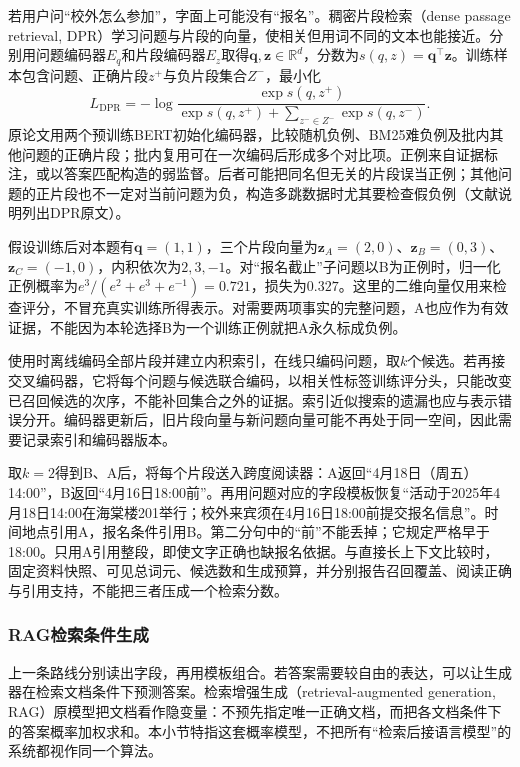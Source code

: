 若用户问“校外怎么参加”，字面上可能没有“报名”。稠密片段检索（dense passage retrieval, DPR）学习问题与片段的向量，使相关但用词不同的文本也能接近。分别用问题编码器$E_q$和片段编码器$E_z$取得$\bm{q},\bm{z}\in\mathbb{R}^d$，分数为$s(q,z)=\bm{q}^{\top}\bm{z}$。训练样本包含问题、正确片段$z^+$与负片段集合$Z^-$，最小化
\begin{equation}
 L_{\mathrm{DPR}}=
 -\log\frac{\exp s(q,z^+)}
 {\exp s(q,z^+)+\sum_{z^-\in Z^-}\exp s(q,z^-)}.
 \label{eq:nlp-dialogue-dpr}
\end{equation}
原论文用两个预训练BERT初始化编码器，比较随机负例、BM25难负例及批内其他问题的正确片段；批内复用可在一次编码后形成多个对比项。正例来自证据标注，或以答案匹配构造的弱监督。后者可能把同名但无关的片段误当正例；其他问题的正片段也不一定对当前问题为负，构造多跳数据时尤其要检查假负例（文献说明列出DPR原文）。

假设训练后对本题有$\bm{q}=(1,1)$，三个片段向量为$\bm{z}_A=(2,0)$、$\bm{z}_B=(0,3)$、$\bm{z}_C=(-1,0)$，内积依次为$2,3,-1$。对“报名截止”子问题以B为正例时，归一化正例概率为$e^3/(e^2+e^3+e^{-1})=0.721$，损失为$0.327$。这里的二维向量仅用来检查评分，不冒充真实训练所得表示。对需要两项事实的完整问题，A也应作为有效证据，不能因为本轮选择B为一个训练正例就把A永久标成负例。

使用时离线编码全部片段并建立内积索引，在线只编码问题，取$k$个候选。若再接交叉编码器，它将每个问题与候选联合编码，以相关性标签训练评分头，只能改变已召回候选的次序，不能补回集合之外的证据。索引近似搜索的遗漏也应与表示错误分开。编码器更新后，旧片段向量与新问题向量可能不再处于同一空间，因此需要记录索引和编码器版本。

取$k=2$得到B、A后，将每个片段送入跨度阅读器：A返回“4月18日（周五）14:00”，B返回“4月16日18:00前”。再用问题对应的字段模板恢复“活动于2025年4月18日14:00在海棠楼201举行；校外来宾须在4月16日18:00前提交报名信息”。时间地点引用A，报名条件引用B。第二分句中的“前”不能丢掉；它规定严格早于18:00。只用A引用整段，即使文字正确也缺报名依据。与直接长上下文比较时，固定资料快照、可见总词元、候选数和生成预算，并分别报告召回覆盖、阅读正确与引用支持，不能把三者压成一个检索分数。

\subsubsection{RAG检索条件生成}
\label{sec:nlp-dialogue-rag}

上一条路线分别读出字段，再用模板组合。若答案需要较自由的表达，可以让生成器在检索文档条件下预测答案。检索增强生成（retrieval-augmented generation, RAG）原模型把文档看作隐变量：不预先指定唯一正确文档，而把各文档条件下的答案概率加权求和。本小节特指这套概率模型，不把所有“检索后接语言模型”的系统都视作同一个算法。

